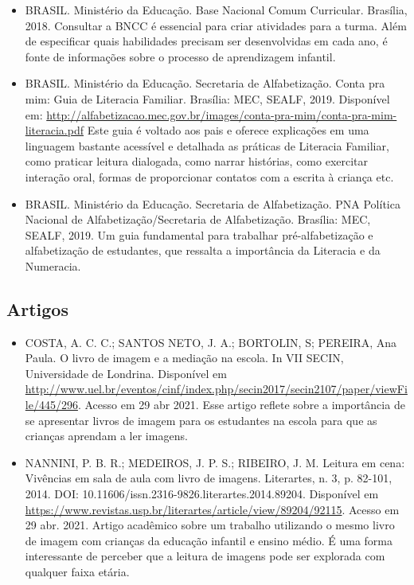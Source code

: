 \documentclass[11pt]{extarticle}
\begin{document}
\begin{itemize}
\item BRASIL. Ministério da Educação. Base Nacional Comum Curricular. Brasília, 2018.
Consultar a BNCC é essencial para criar atividades para a turma. Além de especificar 
quais habilidades precisam ser desenvolvidas em cada ano, é fonte de informações sobre 
o processo de aprendizagem infantil. 

\item BRASIL. Ministério da Educação. Secretaria de Alfabetização. Conta pra mim: Guia de Literacia Familiar. 
Brasília: MEC, SEALF, 2019. Disponível em: \url{http://alfabetizacao.mec.gov.br/images/conta-pra-mim/conta-pra-mim-literacia.pdf}
Este guia é voltado aos pais e oferece explicações em uma linguagem bastante acessível e detalhada as práticas de Literacia Familiar, 
como praticar leitura dialogada, como narrar histórias, como exercitar interação oral, formas de proporcionar contatos com a escrita à criança etc. 
 
\item BRASIL. Ministério da Educação. Secretaria de Alfabetização. PNA Política Nacional de Alfabetização/Secretaria 
de Alfabetização. Brasília: MEC, SEALF, 2019.
Um guia fundamental para trabalhar pré-alfabetização e alfabetização de estudantes, que ressalta a importância da Literacia e da Numeracia. 


\end{itemize}

\subsection{Artigos}

\begin{itemize}
\item COSTA, A. C. C.; SANTOS NETO, J. A.; BORTOLIN, S; PEREIRA, Ana Paula. O livro de imagem e a mediação na escola. 
In VII SECIN, Universidade de Londrina. Disponível em \url{http://www.uel.br/eventos/cinf/index.php/secin2017/secin2107/paper/viewFile/445/296}. 
Acesso em 29 abr 2021. 
Esse artigo reflete sobre a importância de se apresentar livros de imagem para os estudantes na escola para que as crianças aprendam a ler imagens. 

\item NANNINI, P. B. R.; MEDEIROS, J. P. S.; RIBEIRO, J. M. Leitura em cena: Vivências em sala de aula com livro de imagens. 
Literartes, n. 3, p. 82-101, 2014. DOI: 10.11606/issn.2316-9826.literartes.2014.89204. 
Disponível em \url{https://www.revistas.usp.br/literartes/article/view/89204/92115}. Acesso em 29 abr. 2021. 
Artigo acadêmico sobre um trabalho utilizando o mesmo livro de imagem com crianças da educação infantil e ensino médio. 
É uma forma interessante de perceber que a leitura de imagens pode ser explorada com qualquer faixa etária. 
\end{itemize}
\end{document}
